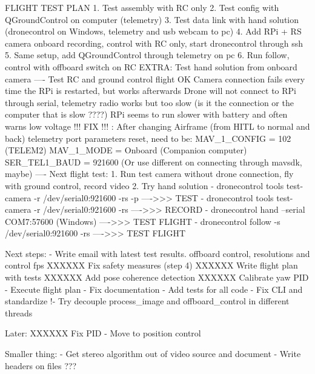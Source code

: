 FLIGHT TEST PLAN
1. Test assembly with RC only
2. Test config with QGroundControl on computer (telemetry)
3. Test data link with hand solution (dronecontrol on Windows, telemetry and usb webcam to pc)
4. Add RPi + RS camera onboard recording, control with RC only, start dronecontrol through ssh
5. Same setup, add QGroundControl through telemetry on pc
6. Run follow, control with offboard switch on RC
EXTRA: Test hand solution from onboard camera
----
Test RC and ground control flight OK
Camera connection fails every time the RPi is restarted, but works afterwards
Drone will not connect to RPi through serial, telemetry radio works but too slow (is it the connection or the computer that is slow ????)
RPi seems to run slower with battery and often warns low voltage
!!! FIX !!! : After changing Airframe (from HITL to normal and back) telemetry port parameters reset, need to be: 
MAV_1_CONFIG = 102 (TELEM2)
MAV_1_MODE = Onboard (Companion computer)
SER_TEL1_BAUD = 921600 (Or use different on connecting through mavsdk, maybe)
----
Next flight test:
1. Run test camera without drone connection, fly with ground control, record video
2. Try hand solution
- dronecontrol tools test-camera -r /dev/serial0:921600 -rs -p   ---->>> TEST
- dronecontrol tools test-camera -r /dev/serial0:921600 -rs      ---->>> RECORD
- dronecontrol hand --serial COM7:57600 (Windows)                ---->>> TEST FLIGHT
- dronecontrol follow -s /dev/serial0:921600 -rs                 ---->>> TEST FLIGHT



Next steps:
 - Write email with latest test results. offboard control, resolutions and control fps
 XXXXXX Fix safety measures (step 4)
 XXXXXX Write flight plan with tests
 XXXXXX Add pose coherence detection
 XXXXXX Calibrate yaw PID
 - Execute flight plan
 - Fix documentation
 - Add tests for all code
 - Fix CLI and standardize 
 !- Try decouple process_image and offboard_control in different threads
 
Later:
 XXXXXX Fix PID
 - Move to position control
 
 Smaller thing:
  - Get stereo algorithm out of video source and document
  - Write headers on files ???
  